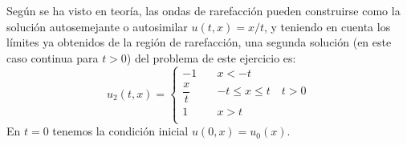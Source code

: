 \documentclass[12pt]{article}
\begin{document}
\begin{ejercicio}
        Según se ha visto en teoría, las ondas de rarefacción pueden construirse como la solución autosemejante o autosimilar $u(t,x) = x/t$,
        y teniendo en cuenta los límites ya obtenidos de la región de rarefacción, una segunda solución (en este caso continua para $t > 0$)
        del problema de este ejercicio es:
        $$\boxed{u_2(t,x) = \begin{cases}
            -1 \quad& x < -t \\
            \dfrac{x}{t} \quad& -t \leq x \leq t \quad t > 0\\
            1 \quad& x > t \\
        \end{cases}}$$
        En $t=0$ tenemos la condición inicial $u(0,x) = u_0(x)$.
    \end{ejercicio}
    
\end{document}
